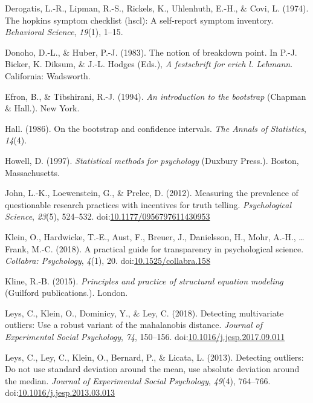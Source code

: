 \documentclass[man,floatsintext]{apa6}
\begin{document}
\leavevmode\hypertarget{ref-Derogatis_et_al_1974}{}%
Derogatis, L.-R., Lipman, R.-S., Rickels, K., Uhlenhuth, E.-H., \& Covi, L. (1974). The hopkins symptom checklist (hscl): A self‐report symptom inventory. \emph{Behavioral Science}, \emph{19}(1), 1--15.

\leavevmode\hypertarget{ref-Donoho_and_Huber_1983}{}%
Donoho, D.-L., \& Huber, P.-J. (1983). The notion of breakdown point. In P.-J. Bicker, K. Diksum, \& J.-L. Hodges (Eds.), \emph{A festschrift for erich l. Lehmann}. California: Wadsworth.

\leavevmode\hypertarget{ref-Efron_Tibshirani_1994}{}%
Efron, B., \& Tibshirani, R.-J. (1994). \emph{An introduction to the bootstrap} (Chapman \& Hall.). New York.

\leavevmode\hypertarget{ref-Hall_1986}{}%
Hall. (1986). On the bootstrap and confidence intervals. \emph{The Annals of Statistics}, \emph{14}(4).

\leavevmode\hypertarget{ref-Howell_1997}{}%
Howell, D. (1997). \emph{Statistical methods for psychology} (Duxbury Press.). Boston, Massachusetts.

\leavevmode\hypertarget{ref-John_et_al_2012}{}%
John, L.-K., Loewenstein, G., \& Prelec, D. (2012). Measuring the prevalence of questionable research practices with incentives for truth telling. \emph{Psychological Science}, \emph{23}(5), 524--532. doi:\href{https://doi.org/10.1177/0956797611430953}{10.1177/0956797611430953}

\leavevmode\hypertarget{ref-Klein_et_al_2018}{}%
Klein, O., Hardwicke, T.-E., Aust, F., Breuer, J., Danielsson, H., Mohr, A.-H., \ldots{} Frank, M.-C. (2018). A practical guide for transparency in psychological science. \emph{Collabra: Psychology}, \emph{4}(1), 20. doi:\href{https://doi.org/10.1525/collabra.158}{10.1525/collabra.158}

\leavevmode\hypertarget{ref-Kline_2015}{}%
Kline, R.-B. (2015). \emph{Principles and practice of structural equation modeling} (Guilford publications.). London.

\leavevmode\hypertarget{ref-Leys_et_al_2018}{}%
Leys, C., Klein, O., Dominicy, Y., \& Ley, C. (2018). Detecting multivariate outliers: Use a robust variant of the mahalanobis distance. \emph{Journal of Experimental Social Psychology}, \emph{74}, 150--156. doi:\href{https://doi.org/10.1016/j.jesp.2017.09.011}{10.1016/j.jesp.2017.09.011}

\leavevmode\hypertarget{ref-Leys_et_al_2013}{}%
Leys, C., Ley, C., Klein, O., Bernard, P., \& Licata, L. (2013). Detecting outliers: Do not use standard deviation around the mean, use absolute deviation around the median. \emph{Journal of Experimental Social Psychology}, \emph{49}(4), 764--766. doi:\href{https://doi.org/10.1016/j.jesp.2013.03.013}{10.1016/j.jesp.2013.03.013}
\end{document}
